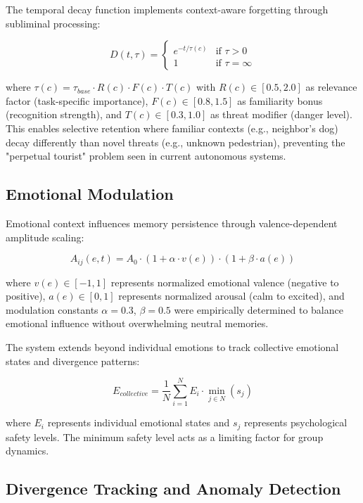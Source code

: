 \documentclass[11pt,letterpaper]{article}
\begin{document}
The temporal decay function implements context-aware forgetting through subliminal processing:

\begin{equation}
D(t,\tau) = \begin{cases}
e^{-t/\tau(c)} & \text{if } \tau > 0 \\
1 & \text{if } \tau = \infty
\end{cases}
\end{equation}

where $\tau(c) = \tau_{base} \cdot R(c) \cdot F(c) \cdot T(c)$ with $R(c) \in [0.5, 2.0]$ as relevance factor (task-specific importance), $F(c) \in [0.8, 1.5]$ as familiarity bonus (recognition strength), and $T(c) \in [0.3, 1.0]$ as threat modifier (danger level). This enables selective retention where familiar contexts (e.g., neighbor's dog) decay differently than novel threats (e.g., unknown pedestrian), preventing the "perpetual tourist" problem seen in current autonomous systems.

\subsection{Emotional Modulation}

Emotional context influences memory persistence through valence-dependent amplitude scaling:

\begin{equation}
A_{ij}(e,t) = A_0 \cdot (1 + \alpha \cdot v(e)) \cdot (1 + \beta \cdot a(e))
\end{equation}

where $v(e) \in [-1, 1]$ represents normalized emotional valence (negative to positive), $a(e) \in [0, 1]$ represents normalized arousal (calm to excited), and modulation constants $\alpha = 0.3$, $\beta = 0.5$ were empirically determined to balance emotional influence without overwhelming neutral memories.

The system extends beyond individual emotions to track collective emotional states and divergence patterns:

\begin{equation}
E_{collective} = \frac{1}{N} \sum_{i=1}^{N} E_i \cdot \min_{j \in N}(s_j)
\end{equation}

where $E_i$ represents individual emotional states and $s_j$ represents psychological safety levels. The minimum safety level acts as a limiting factor for group dynamics.

\subsection{Divergence Tracking and Anomaly Detection}
\end{document}
